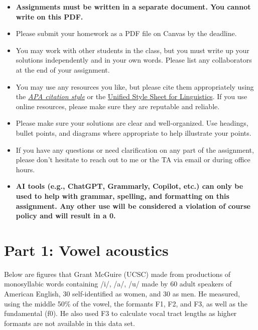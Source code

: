 \documentclass[12pt, letterpaper]{article}
\begin{document}
\begin{tcolorbox}[colback=LightGray!10!white,colframe=LightGray!75!black,title=Instructions]
    \begin{itemize}
        \item \textbf{Assignments must be written in a separate document. You cannot write on this PDF.} 
        \item Please submit your homework as a PDF file on Canvas by the deadline.
        \item You may work with other students in the class, but you must write up your solutions independently and in your own words. Please list any collaborators at the end of your assignment.
        \item You may use any resources you like, but please cite them appropriately using the \href{https://apastyle.apa.org/}{\textit{APA citation style}} or the \href{https://langsci-press.org/unifiedstylesheet}{Unified Style Sheet for Linguistics}. If you use online resources, please make sure they are reputable and reliable.
        \item Please make sure your solutions are clear and well-organized. Use headings, bullet points, and diagrams where appropriate to help illustrate your points.
        \item If you have any questions or need clarification on any part of the assignment, please don't hesitate to reach out to me or the TA via email or during office hours.
        \item \textbf{AI tools (e.g., ChatGPT, Grammarly, Copilot, etc.) can only be used to help with grammar, spelling, and formatting on this assignment. Any other use will be considered a violation of course policy and will result in a 0.}
    \end{itemize}
\end{tcolorbox}

\section*{Part 1: Vowel acoustics} \label{sec:acoustics}

Below are figures that Grant McGuire (UCSC) made from productions of monosyllabic words containing /i/, /a/, /u/ made by 60 adult speakers of American English, 30 self-identified as women, and 30 as men. He measured, using the middle 50\% of the vowel, the formants F1, F2, and F3, as well as the fundamental (f0). He also used F3 to calculate vocal tract lengths as higher formants are not available in this data set.
\end{document}
